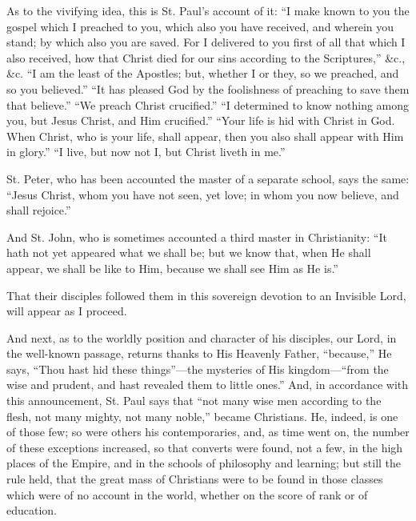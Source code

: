 As to the vivifying idea, this is St. Paul's account of it: ``I
make known to you the gospel which I preached to you, which also you
have received, and wherein you stand; by which also you are saved. For
I delivered to you first of all that which I also received, how that
Christ died for our sins according to the Scriptures,'' \&c.,
\&c. ``I am the least of the Apostles; but, whether I or they,
so we preached, and so you believed.'' ``It has pleased God by
the foolishness of preaching to save them that believe.'' ``We
preach Christ crucified.'' ``I determined to know nothing
among you, but Jesus Christ, and Him crucified.'' ``Your life
is hid with Christ in God. When Christ, who is your life, shall
appear, then you also shall appear with Him in glory.'' ``I
live, but now not I, but Christ liveth in me.''

St. Peter, who has been accounted the master of a separate school,
says the same: ``Jesus Christ, whom you have not seen, yet love;
in whom you now believe, and shall rejoice.''

And St. John, who is sometimes accounted a third master in
Christianity: ``It hath not yet appeared what we shall be; but we
know that, when He shall appear, we shall be like to Him, because we
shall see Him as He is.''

That their disciples followed them in this sovereign devotion to an
Invisible Lord, will appear as I proceed.

And next, as to the worldly position and character of his
disciples, our Lord, in the well-known passage, returns thanks to His
Heavenly Father, ``because,'' He says, ``Thou hast hid
these things''—the mysteries of His kingdom—``from the
wise and prudent, and hast revealed them to little ones.'' And, in
accordance with this announcement, St. Paul says that ``not many
wise men according to the flesh, not many mighty, not many
noble,'' became Christians. He, indeed, is one of those few; so
were others his contemporaries, and, as time went on, the number of
these exceptions increased, so that converts were found, not a few, in
the high places of the Empire, and in the schools of philosophy and
learning; but still the rule held, that the great mass of Christians
were to be found in those classes which were of no account in the
world, whether on the score of rank or of education.

